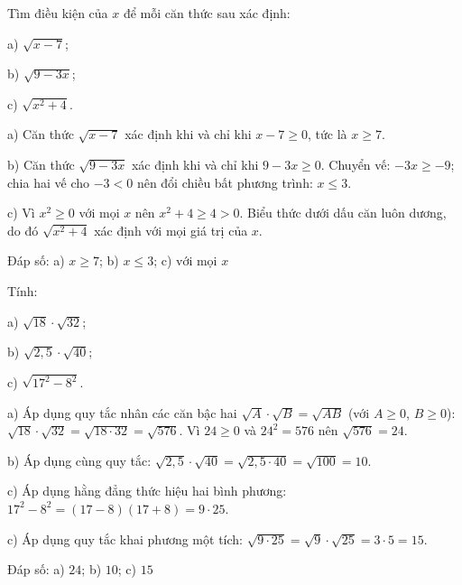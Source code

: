 \begin{problem}[9DS-CAN-033]
Tìm điều kiện của $x$ để mỗi căn thức sau xác định:

a) $\sqrt{x - 7}$;

b) $\sqrt{9 - 3x}$;

c) $\sqrt{x^2 + 4}$.

\begin{solution}
a) Căn thức $\sqrt{x - 7}$ xác định khi và chỉ khi $x - 7 \geq 0$, tức là $x \geq 7$.

b) Căn thức $\sqrt{9 - 3x}$ xác định khi và chỉ khi $9 - 3x \geq 0$. Chuyển vế: $-3x \geq -9$; chia hai vế cho $-3 < 0$ nên đổi chiều bất phương trình: $x \leq 3$.

c) Vì $x^2 \geq 0$ với mọi $x$ nên $x^2 + 4 \geq 4 > 0$. Biểu thức dưới dấu căn luôn dương, do đó $\sqrt{x^2 + 4}$ xác định với mọi giá trị của $x$.

Đáp số: a) $\boxed{x \geq 7}$; b) $\boxed{x \leq 3}$; c) $\boxed{\text{với mọi } x}$
\end{solution}
\end{problem}

\begin{problem}[9DS-CAN-034]
Tính:

a) $\sqrt{18} \cdot \sqrt{32}$;

b) $\sqrt{2{,}5} \cdot \sqrt{40}$;

c) $\sqrt{17^2 - 8^2}$.

\begin{solution}
a) Áp dụng quy tắc nhân các căn bậc hai $\sqrt{A} \cdot \sqrt{B} = \sqrt{AB}$ (với $A \geq 0$, $B \geq 0$): $\sqrt{18} \cdot \sqrt{32} = \sqrt{18 \cdot 32} = \sqrt{576}$. Vì $24 \geq 0$ và $24^2 = 576$ nên $\sqrt{576} = 24$.

b) Áp dụng cùng quy tắc: $\sqrt{2{,}5} \cdot \sqrt{40} = \sqrt{2{,}5 \cdot 40} = \sqrt{100} = 10$.

c) Áp dụng hằng đẳng thức hiệu hai bình phương: $17^2 - 8^2 = (17 - 8)(17 + 8) = 9 \cdot 25$.

c) Áp dụng quy tắc khai phương một tích: $\sqrt{9 \cdot 25} = \sqrt{9} \cdot \sqrt{25} = 3 \cdot 5 = 15$.

Đáp số: a) $\boxed{24}$; b) $\boxed{10}$; c) $\boxed{15}$
\end{solution}
\end{problem}

